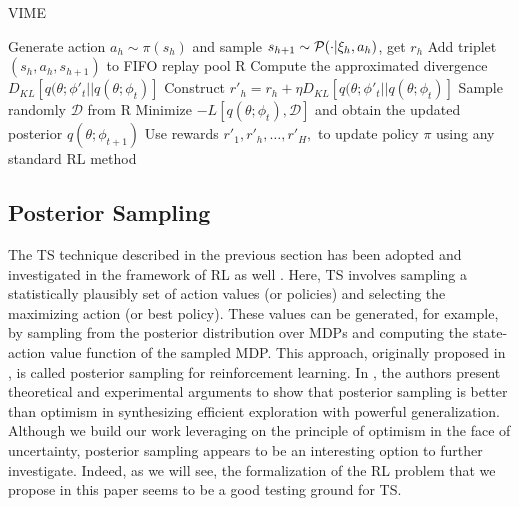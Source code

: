 \begin{algorithm}[t]
	\caption{\gls{VIME}}
	\label{alg:VIME}
	\begin{algorithmic}[1]
			\State Generate action $a_h\sim\pi(s_h)$ and sample $s_{h+1}\sim\mathcal{P}(\cdot|\xi_h,a_h)$, get $r_h$
			\State Add triplet $(s_h,a_h,s_{h+1})$ to FIFO replay pool R
			\State Compute the approximated divergence $D_{KL}[q(\theta;\phi'_{t}||q(\theta;\phi_{t})]$
			\State Construct $r'_h = r_h + \eta D_{KL}[q(\theta;\phi'_{t}||q(\theta;\phi_{t})]$
		\EndFor
		\State Sample randomly $\mathcal{D}$ from R
		\State Minimize $-L[q(\theta;\phi_t),\mathcal{D}]$ and obtain the updated posterior $q(\theta;\phi_{t+1})$
		\State Use rewards ${r'_1,r'_h,\dots,r'_H,}$ to update policy $\pi$ using any standard \gls{RL} method
	\EndFor
	\end{algorithmic}
\end{algorithm}

\subsection{Posterior Sampling} \label{sub:posteriorRL}
The \gls{TS} technique described in the previous section has been adopted and investigated in the framework of \gls{RL} as well \cite{strens2000bayesian, osband2013more, osband2015bootstrapped, osband2016deep}. Here, \gls{TS} involves sampling a statistically plausibly set of action values (or policies) and selecting the maximizing action (or best policy). These values can be generated, for example, by sampling from the posterior distribution over MDPs and computing the state-action value function of the sampled MDP. This approach, originally proposed in \cite{strens2000bayesian}, is called posterior sampling for reinforcement learning. In \cite{osband2017posterior}, the authors present theoretical and experimental arguments to show that posterior sampling is better than optimism in synthesizing efficient exploration with powerful generalization. Although we build our work leveraging on the principle of optimism in the face of uncertainty, posterior sampling appears to be an interesting option to further investigate. Indeed, as we will see, the formalization of the \gls{RL} problem that we propose in this paper seems to be a good testing ground for \gls{TS}.